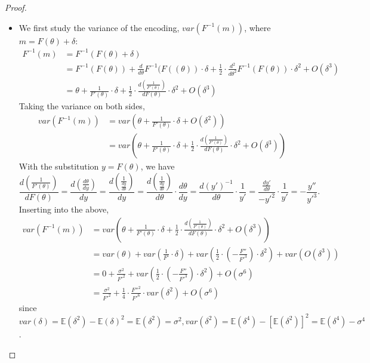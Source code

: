 \begin{proof}
\begin{itemize}
    \item We first study the variance of the encoding, {$var(F^{-1}(m))$}, where $m = F(\theta)  + \delta$:
    \begin{align*}
    F^{-1}(m) &= F^{-1}(F(\theta) + \delta)\\
                &= F^{-1}(F(\theta)) + \frac{d}{d\theta} F^{-1}(F((\theta)) \cdot \delta + \frac{1}{2} \cdot \frac{d^2}{d\theta^2} F^{-1}(F(\theta)) \cdot \delta^2 + O(\delta^3)\\
                &= \theta + \frac{1}{F'(\theta)} \cdot \delta + \frac{1}{2} \cdot \frac{d(\frac{1}{F'(\theta)})}{d F(\theta)} \cdot \delta^2 + O(\delta^3)
                \end{align*}
Taking the variance on both sides,
\begin{align*}                
    var(F^{-1}(m)) &= var(\theta + \frac{1}{F'(\theta)} \cdot \delta + O(\delta^2)) \\
                    &= var\left(\theta + \frac{1}{F'(\theta)} \cdot \delta + \frac{1}{2} \cdot \frac{d(\frac{1}{F'(\theta)})}{d F(\theta)} \cdot \delta^2 + O(\delta^3)\right)
\end{align*}
With the substitution $y = F(\theta)$, we have
\begin{equation*}\frac{d(\frac{1}{F'(\theta)})}{d F(\theta)} = \frac{d(\frac{d\theta}{dy})}{dy} = \frac{d(\frac{1}{\frac{dy}{d\theta}})}{dy} = \frac{d(\frac{1}{\frac{dy}{d\theta}})}{d\theta} \cdot \frac{d\theta}{dy} = \frac{d(y')^{-1}}{d\theta} \cdot \frac{1}{y'} = \frac{\frac{dy'}{d\theta}}{-y'^2} \cdot \frac{1}{y'} = -\frac{y''}{y'^3}.
\end{equation*}
Inserting into the above,
\begin{align*}
    var(F^{-1}(m)) &= var\left(\theta + \frac{1}{F'(\theta)} \cdot \delta + \frac{1}{2} \cdot \frac{d(\frac{1}{F'(\theta)})}{d F(\theta)} \cdot \delta^2 + O(\delta^3)\right)\\
    &= var(\theta) + var\left(\frac{1}{F'} \cdot \delta\right) + var\left(\frac{1}{2} \cdot \left(-\frac{F''}{F'^3}\right) \cdot \delta^2\right) + var\left(O(\delta^3)\right)\\
    &= 0 + \frac{\sigma^2}{F'^2} + var\left(\frac{1}{2} \cdot \left(-\frac{F''}{F'^3}\right) \cdot \delta^2\right) + O(\sigma^6)\\
    &= \frac{\sigma^2}{F'^2} + \frac{1}{4} \cdot \frac{F''^2}{F'^6} \cdot var(\delta^2) + O(\sigma^6)
\end{align*}
since $var(\delta) = \mathbb{E}(\delta^2) - \mathbb{E}(\delta)^2 = \mathbb{E}(\delta^2) = \sigma^2, var\left(\delta^2\right) = \mathbb{E}(\delta^4) - [\mathbb{E}(\delta^2)]^2 = \mathbb{E}(\delta^4) - \sigma^4$.


\end{itemize}
\end{proof}
